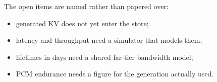 \documentclass[conference]{IEEEtran}
\begin{document}
The open items are named rather than papered over:
\begin{itemize}
  \item generated KV does not yet enter the store;
  \item latency and throughput need a simulator that models them;
  \item lifetimes in days need a shared far-tier bandwidth model;
  \item PCM endurance needs a figure for the generation actually used.
\end{itemize}

\end{document}
